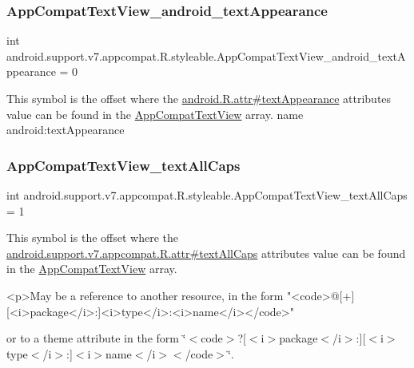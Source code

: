 \subsubsection{\texorpdfstring{App\+Compat\+Text\+View\+\_\+android\+\_\+text\+Appearance}{AppCompatTextView\_android\_textAppearance}}
{\footnotesize\ttfamily int android.\+support.\+v7.\+appcompat.\+R.\+styleable.\+App\+Compat\+Text\+View\+\_\+android\+\_\+text\+Appearance = 0\hspace{0.3cm}{\ttfamily [static]}}

This symbol is the offset where the \hyperlink{}{android.\+R.\+attr\#text\+Appearance} attribute\textquotesingle{}s value can be found in the \hyperlink{classandroid_1_1support_1_1v7_1_1appcompat_1_1R_1_1styleable_a87384e67b6e421e7c07536d9afe8d185}{App\+Compat\+Text\+View} array.  name android\+:text\+Appearance \mbox{\label{classandroid_1_1support_1_1v7_1_1appcompat_1_1R_1_1styleable_a991a7f424270ded62fc81772e1855c97}} 
\subsubsection{\texorpdfstring{App\+Compat\+Text\+View\+\_\+text\+All\+Caps}{AppCompatTextView\_textAllCaps}}
{\footnotesize\ttfamily int android.\+support.\+v7.\+appcompat.\+R.\+styleable.\+App\+Compat\+Text\+View\+\_\+text\+All\+Caps = 1\hspace{0.3cm}{\ttfamily [static]}}

This symbol is the offset where the \hyperlink{classandroid_1_1support_1_1v7_1_1appcompat_1_1R_1_1attr_a3bd1f2ce4b725772d80858408dc8d52c}{android.\+support.\+v7.\+appcompat.\+R.\+attr\#text\+All\+Caps} attribute\textquotesingle{}s value can be found in the \hyperlink{classandroid_1_1support_1_1v7_1_1appcompat_1_1R_1_1styleable_a87384e67b6e421e7c07536d9afe8d185}{App\+Compat\+Text\+View} array.

\begin{DoxyVerb}      <p>May be a reference to another resource, in the form "<code>@[+][<i>package</i>:]<i>type</i>:<i>name</i></code>"
\end{DoxyVerb}
 or to a theme attribute in the form \char`\"{}$<$code$>$?\mbox{[}$<$i$>$package$<$/i$>$\+:\mbox{]}\mbox{[}$<$i$>$type$<$/i$>$\+:\mbox{]}$<$i$>$name$<$/i$>$$<$/code$>$\char`\"{}. 

